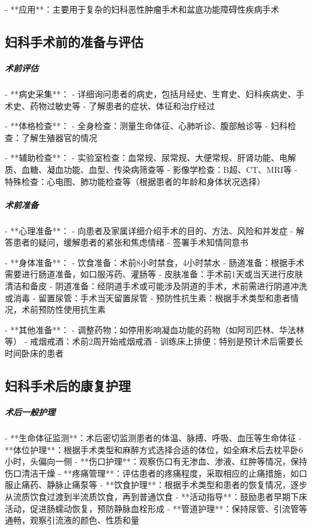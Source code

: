\begin{enumerate}
- **应用**：主要用于复杂的妇科恶性肿瘤手术和盆底功能障碍性疾病手术

\subsection{妇科手术前的准备与评估}

\subparagraph{术前评估}

- **病史采集**：
  - 详细询问患者的病史，包括月经史、生育史、妇科疾病史、手术史、药物过敏史等
  - 了解患者的症状、体征和治疗经过

- **体格检查**：
  - 全身检查：测量生命体征、心肺听诊、腹部触诊等
  - 妇科检查：了解生殖器官的情况

- **辅助检查**：
  - 实验室检查：血常规、尿常规、大便常规、肝肾功能、电解质、血糖、凝血功能、血型、传染病筛查等
  - 影像学检查：B超、CT、MRI等
  - 特殊检查：心电图、肺功能检查等（根据患者的年龄和身体状况选择）

\subparagraph{术前准备}

- **心理准备**：
  - 向患者及家属详细介绍手术的目的、方法、风险和并发症
  - 解答患者的疑问，缓解患者的紧张和焦虑情绪
  - 签署手术知情同意书

- **身体准备**：
  - 饮食准备：术前8小时禁食，4小时禁水
  - 肠道准备：根据手术需要进行肠道准备，如口服泻药、灌肠等
  - 皮肤准备：手术前1天或当天进行皮肤清洁和备皮
  - 阴道准备：经阴道手术或可能涉及阴道的手术，术前需进行阴道冲洗或消毒
  - 留置尿管：手术当天留置尿管
  - 预防性抗生素：根据手术类型和患者情况，术前预防性使用抗生素

- **其他准备**：
  - 调整药物：如停用影响凝血功能的药物（如阿司匹林、华法林等）
  - 戒烟戒酒：术前2周开始戒烟戒酒
  - 训练床上排便：特别是预计术后需要长时间卧床的患者

\subsection{妇科手术后的康复护理}

\subparagraph{术后一般护理}

- **生命体征监测**：术后密切监测患者的体温、脉搏、呼吸、血压等生命体征
- **体位护理**：根据手术类型和麻醉方式选择合适的体位，如全麻术后去枕平卧6小时，头偏向一侧
- **伤口护理**：观察伤口有无渗血、渗液、红肿等情况，保持伤口清洁干燥
- **疼痛管理**：评估患者的疼痛程度，采取相应的止痛措施，如口服止痛药、静脉止痛泵等
- **饮食护理**：根据手术类型和患者的恢复情况，逐步从流质饮食过渡到半流质饮食，再到普通饮食
- **活动指导**：鼓励患者早期下床活动，促进肠蠕动恢复，预防静脉血栓形成
- **管道护理**：保持尿管、引流管等通畅，观察引流液的颜色、性质和量


\end{enumerate}
